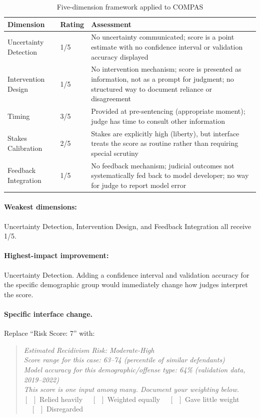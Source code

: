 \begin{table}[htbp]
\caption{Five-dimension framework applied to COMPAS}
\label{tab:compas-five-dim}
\centering
\begin{tabular}{@{}p{3.5cm}p{1.5cm}p{7cm}@{}}
\toprule
\textbf{Dimension} & \textbf{Rating} & \textbf{Assessment} \\
\midrule
Uncertainty Detection & 1/5 & No uncertainty communicated; score is a point estimate with no confidence interval or validation accuracy displayed \\
Intervention Design & 1/5 & No intervention mechanism; score is presented as information, not as a prompt for judgment; no structured way to document reliance or disagreement \\
Timing & 3/5 & Provided at pre-sentencing (appropriate moment); judge has time to consult other information \\
Stakes Calibration & 2/5 & Stakes are explicitly high (liberty), but interface treats the score as routine rather than requiring special scrutiny \\
Feedback Integration & 1/5 & No feedback mechanism; judicial outcomes not systematically fed back to model developer; no way for judge to report model error \\
\bottomrule
\end{tabular}
\end{table}

\paragraph{Weakest dimensions:} Uncertainty Detection, Intervention Design, and Feedback Integration all receive 1/5.

\paragraph{Highest-impact improvement:} Uncertainty Detection. Adding a confidence interval and validation accuracy for the specific demographic group would immediately change how judges interpret the score.

\paragraph{Specific interface change.}
Replace ``Risk Score: 7'' with:
\begin{quote}
\textit{Estimated Recidivism Risk: Moderate-High}\\
\textit{Score range for this case: 63--74 (percentile of similar defendants)}\\
\textit{Model accuracy for this demographic/offense type: 64\% (validation data, 2019--2022)}\\
\textit{This score is one input among many. Document your weighting below.}\\
$[\;\;]$ Relied heavily $\quad[\;\;]$ Weighted equally $\quad[\;\;]$ Gave little weight $\quad[\;\;]$ Disregarded
\end{quote}

